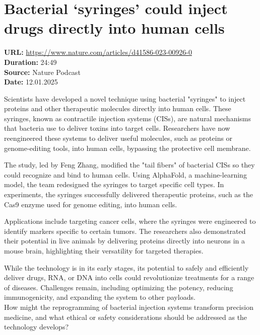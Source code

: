 \documentclass[12pt]{article}
\begin{document}
\section{Bacterial ‘syringes’ could inject drugs directly into human cells}
\textbf{URL:} \url{https://www.nature.com/articles/d41586-023-00926-0}\\
\textbf{Duration:} 24:49\\
\textbf{Source:} Nature Podcast\\
\textbf{Date:} 12.01.2025
  

Scientists have developed a novel technique using bacterial "syringes" to inject proteins and other therapeutic molecules directly into human cells. These syringes, known as contractile injection systems (CISs), are natural mechanisms that bacteria use to deliver toxins into target cells. Researchers have now reengineered these systems to deliver useful molecules, such as proteins or genome-editing tools, into human cells, bypassing the protective cell membrane.  

The study, led by Feng Zhang, modified the "tail fibers" of bacterial CISs so they could recognize and bind to human cells. Using AlphaFold, a machine-learning model, the team redesigned the syringes to target specific cell types. In experiments, the syringes successfully delivered therapeutic proteins, such as the Cas9 enzyme used for genome editing, into human cells.  

Applications include targeting cancer cells, where the syringes were engineered to identify markers specific to certain tumors. The researchers also demonstrated their potential in live animals by delivering proteins directly into neurons in a mouse brain, highlighting their versatility for targeted therapies.  

While the technology is in its early stages, its potential to safely and efficiently deliver drugs, RNA, or DNA into cells could revolutionize treatments for a range of diseases. Challenges remain, including optimizing the potency, reducing immunogenicity, and expanding the system to other payloads.\\[5px]  
  
How might the reprogramming of bacterial injection systems transform precision medicine, and what ethical or safety considerations should be addressed as the technology develops?  





\newpage
\end{document}
